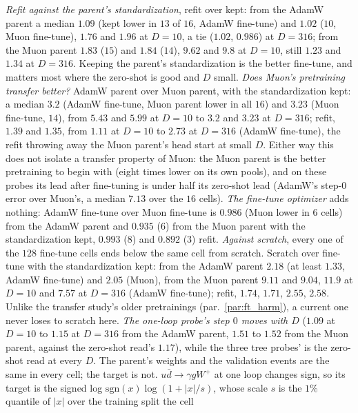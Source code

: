 \documentclass[11pt]{article}
\begin{document}
\begin{itemize}
    \emph{Refit against the parent's standardization}, refit over kept: from the AdamW parent a median $1.09$ (kept
    lower in $13$ of $16$, AdamW fine-tune) and $1.02$ ($10$, Muon fine-tune), $1.76$ and $1.96$ at $D=10$, a tie
    ($1.02$, $0.986$) at $D=316$; from the Muon parent $1.83$ ($15$) and $1.84$ ($14$), $9.62$ and $9.8$ at $D=10$,
    still $1.23$ and $1.34$ at $D=316$. Keeping the parent's standardization is the better fine-tune, and matters most
    where the zero-shot is good and $D$ small.
    \emph{Does Muon's pretraining transfer better?} AdamW parent over Muon parent, with the standardization kept: a
    median $3.2$ (AdamW fine-tune, Muon parent lower in all $16$) and $3.23$ (Muon fine-tune, $14$), from $5.43$ and
    $5.99$ at $D=10$ to $3.2$ and $3.23$ at $D=316$; refit, $1.39$ and $1.35$, from $1.11$ at $D=10$ to $2.73$ at
    $D=316$ (AdamW fine-tune), the refit throwing away the Muon parent's head start at small $D$. Either way this does
    not isolate a transfer property of Muon: the Muon parent is the better pretraining to begin with (eight times lower
    on its own pools), and on these probes its lead after fine-tuning is under half its zero-shot lead (AdamW's
    step-$0$ error over Muon's, a median $7.13$ over the $16$ cells).
    \emph{The fine-tune optimizer} adds nothing: AdamW fine-tune over Muon fine-tune is $0.986$ (Muon lower in $6$
    cells) from the AdamW parent and $0.935$ ($6$) from the Muon parent with the standardization kept, $0.993$ ($8$)
    and $0.892$ ($3$) refit.
    \emph{Against scratch}, every one of the $128$ fine-tune cells ends below the same cell from scratch. Scratch over
    fine-tune with the standardization kept: from the AdamW parent $2.18$ (at least $1.33$, AdamW fine-tune) and
    $2.05$ (Muon), from the Muon parent $9.11$ and $9.04$, $11.9$ at $D=10$ and $7.57$ at $D=316$ (AdamW fine-tune);
    refit, $1.74$, $1.71$, $2.55$, $2.58$. Unlike the transfer study's older pretrainings (par.~\ref{par:ft_harm}), a
    current one never loses to scratch here.
    \emph{The one-loop probe's step $0$ moves with $D$} ($1.09$ at $D=10$ to $1.15$ at $D=316$ from the AdamW parent,
    $1.51$ to $1.52$ from the Muon parent, against the zero-shot read's $1.17$), while the three tree probes' is the
    zero-shot read at every $D$. The parent's weights and the validation events are the same in every cell; the
    target is not. $u\bar d\to\gamma gW^+$ at one loop changes sign, so its target is the signed log
    $\mathrm{sgn}(x)\log(1+|x|/s)$, whose scale $s$ is the $1\%$ quantile of $|x|$ over the training split the cell

\end{itemize}
\end{document}
